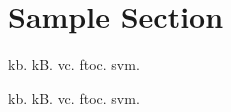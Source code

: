 \documentclass{article}
\begin{document}
\section{Sample Section}
\gls{kb}. \gls{kB}. \gls{vc}. \gls{ftoc}. \gls{svm}.

\gls{kb}. \gls{kB}. \gls{vc}. \gls{ftoc}. \gls{svm}.

\printglossaries
\end{document}
